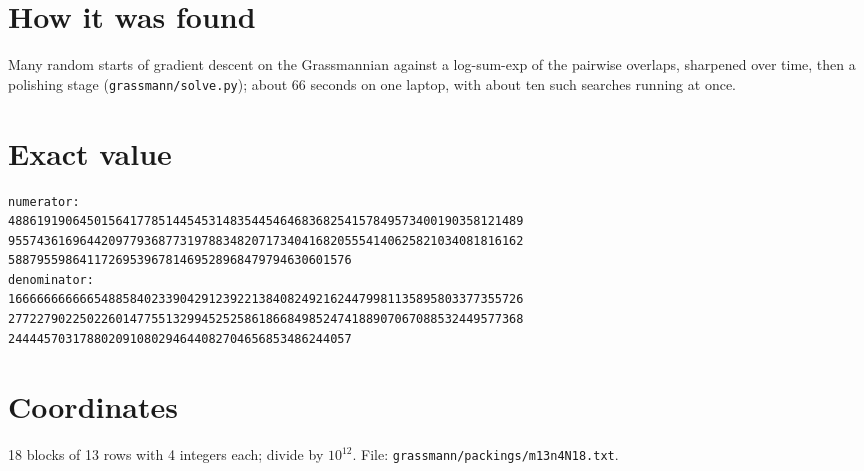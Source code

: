 \documentclass[11pt,a4paper]{article}
\begin{document}
\section{How it was found}
Many random starts of gradient descent on the Grassmannian against a log-sum-exp of the pairwise overlaps, sharpened over time, then a polishing stage (\texttt{grassmann/solve.py}); about 66 seconds on one laptop, with about ten such searches running at once.


\appendix
\section{Exact value}
{\small
\begin{verbatim}
numerator:
488619190645015641778514454531483544546468368254157849573400190358121489
955743616964420977936877319788348207173404168205554140625821034081816162
588795598641172695396781469528968479794630601576
denominator:
166666666666548858402339042912392213840824921624479981135895803377355726
277227902250226014775513299452525861866849852474188907067088532449577368
244445703178802091080294644082704656853486244057
\end{verbatim}}

\section{Coordinates}
18 blocks of 13 rows with 4 integers each; divide by $10^{12}$. File: \texttt{grassmann/packings/m13n4N18.txt}.
{\tiny
\begin{multicols}{3}
\end{multicols}}
\end{document}
